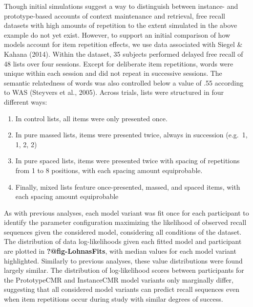\documentclass[
  letterpaper,
]{article}
\begin{document}
Though initial simulations suggest a way to distinguish between
instance- and prototype-based accounts of context maintenance and
retrieval, free recall datasets with high amounts of repetition to the
extent simulated in the above example do not yet exist. However, to
support an initial comparison of how models account for item repetition
effects, we use data associated with Siegel \& Kahana (2014). Within the
dataset, 35 subjects performed delayed free recall of 48 lists over four
sessions. Except for deliberate item repetitions, words were unique
within each session and did not repeat in successive sessions. The
semantic relatedness of words was also controlled below a value of .55
according to WAS (Steyvers et al., 2005). Across trials, lists were
structured in four different ways:

\begin{enumerate}
\def\labelenumi{\arabic{enumi}.}
\item
  In control lists, all items were only presented once.
\item
  In pure massed lists, items were presented twice, always in succession
  (e.g.~1, 1, 2, 2)
\item
  In pure spaced lists, items were presented twice with spacing of
  repetitions from 1 to 8 positions, with each spacing amount
  equiprobable.
\item
  Finally, mixed lists feature once-presented, massed, and spaced items,
  with each spacing amount equiprobable
\end{enumerate}

As with previous analyses, each model variant was fit once for each
participant to identify the parameter configuration maximizing the
likelihood of observed recall sequences given the considered model,
considering all conditions of the dataset. The distribution of data
log-likelihoods given each fitted model and participant are plotted in
\textbf{?@fig-LohnasFits}, with median values for each model variant
highlighted. Similarly to previous analyses, these value distributions
were found largely similar. The distribution of log-likelihood scores
between participants for the PrototypeCMR and InstanceCMR model variants
only marginally differ, suggesting that all considered model variants
can predict recall sequences even when item repetitions occur during
study with similar degrees of success.
\end{document}
